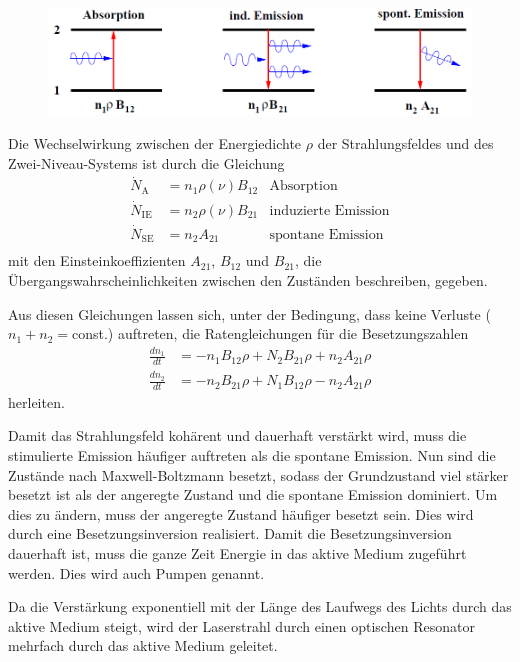 \documentclass[]{scrartcl}
\begin{document}
\begin{figure}[h]
 \centering
 \includegraphics[]{images/schema_uebergaenge.png}
\label{fig:schema_uebergaenge}
\end{figure}

Die Wechselwirkung zwischen der Energiedichte $\rho$ der Strahlungsfeldes und des Zwei-Niveau-Systems ist durch die Gleichung
\begin{align}
 \dot{N}_\text{A}   & =n_1 \rho\left(\nu \right)B_{12}  &\text{Absorption} \\
 \dot{N}_\text{IE}  & =n_2 \rho\left(\nu \right)B_{21}  &\text{induzierte Emission} \\
 \dot{N}_\text{SE}  & =n_2 A_{21}                       &\text{spontane Emission} \\
\end{align}
mit den Einsteinkoeffizienten $A_{21}$, $B_{12}$ und $B_{21}$, die Übergangswahrscheinlichkeiten zwischen den Zuständen beschreiben, gegeben.

Aus diesen Gleichungen lassen sich, unter der Bedingung, dass keine Verluste ($n_1+n_2=$const.) auftreten, die Ratengleichungen für die Besetzungszahlen
\begin{align}
 \frac{d n_1}{d t}&=-n_1B_{12}\rho+N_2B_{21}\rho+n_2A_{21}\rho \\
 \frac{d n_2}{d t}&=-n_2B_{21}\rho+N_1B_{12}\rho-n_2A_{21}\rho
\end{align}
herleiten.

Damit das Strahlungsfeld kohärent und dauerhaft verstärkt wird, muss die stimulierte Emission häufiger auftreten als die spontane Emission. 
Nun sind die Zustände nach Maxwell-Boltzmann besetzt, sodass der Grundzustand viel stärker besetzt ist als der angeregte Zustand und die spontane Emission dominiert.
Um dies zu ändern, muss der angeregte Zustand häufiger besetzt sein. Dies wird durch eine Besetzungsinversion realisiert. 
Damit die Besetzungsinversion dauerhaft ist, muss die ganze Zeit Energie in das aktive Medium zugeführt werden. Dies wird auch Pumpen genannt.

Da die Verstärkung exponentiell mit der Länge des Laufwegs des Lichts durch das aktive Medium steigt, wird der Laserstrahl durch einen optischen Resonator mehrfach durch das aktive Medium geleitet.
\end{document}
